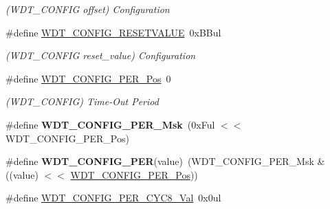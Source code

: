 \begin{DoxyCompactItemize}
\begin{DoxyCompactList}\small\item\em (W\+D\+T\+\_\+\+C\+O\+N\+F\+I\+G offset) Configuration \end{DoxyCompactList}\item 
\hypertarget{group___s_a_m_l21___w_d_t_ga963315e6b2e0dfb513fb236eae8386b0}{}\#define \hyperlink{group___s_a_m_l21___w_d_t_ga963315e6b2e0dfb513fb236eae8386b0}{W\+D\+T\+\_\+\+C\+O\+N\+F\+I\+G\+\_\+\+R\+E\+S\+E\+T\+V\+A\+L\+U\+E}~0x\+B\+Bul\label{group___s_a_m_l21___w_d_t_ga963315e6b2e0dfb513fb236eae8386b0}

\begin{DoxyCompactList}\small\item\em (W\+D\+T\+\_\+\+C\+O\+N\+F\+I\+G reset\+\_\+value) Configuration \end{DoxyCompactList}\item 
\hypertarget{group___s_a_m_l21___w_d_t_ga55662a2fa7e16fd6cc7a5e0800034360}{}\#define \hyperlink{group___s_a_m_l21___w_d_t_ga55662a2fa7e16fd6cc7a5e0800034360}{W\+D\+T\+\_\+\+C\+O\+N\+F\+I\+G\+\_\+\+P\+E\+R\+\_\+\+Pos}~0\label{group___s_a_m_l21___w_d_t_ga55662a2fa7e16fd6cc7a5e0800034360}

\begin{DoxyCompactList}\small\item\em (W\+D\+T\+\_\+\+C\+O\+N\+F\+I\+G) Time-\/\+Out Period \end{DoxyCompactList}\item 
\hypertarget{group___s_a_m_l21___w_d_t_ga7b17345103d170e4fc578db43ad0987e}{}\#define {\bfseries W\+D\+T\+\_\+\+C\+O\+N\+F\+I\+G\+\_\+\+P\+E\+R\+\_\+\+Msk}~(0x\+Ful $<$$<$ W\+D\+T\+\_\+\+C\+O\+N\+F\+I\+G\+\_\+\+P\+E\+R\+\_\+\+Pos)\label{group___s_a_m_l21___w_d_t_ga7b17345103d170e4fc578db43ad0987e}

\item 
\hypertarget{group___s_a_m_l21___w_d_t_gac92933c61d3b2a10b9b14e2c68dcc5c8}{}\#define {\bfseries W\+D\+T\+\_\+\+C\+O\+N\+F\+I\+G\+\_\+\+P\+E\+R}(value)~(W\+D\+T\+\_\+\+C\+O\+N\+F\+I\+G\+\_\+\+P\+E\+R\+\_\+\+Msk \& ((value) $<$$<$ \hyperlink{group___s_a_m_l21___w_d_t_ga55662a2fa7e16fd6cc7a5e0800034360}{W\+D\+T\+\_\+\+C\+O\+N\+F\+I\+G\+\_\+\+P\+E\+R\+\_\+\+Pos}))\label{group___s_a_m_l21___w_d_t_gac92933c61d3b2a10b9b14e2c68dcc5c8}

\item 
\hypertarget{group___s_a_m_l21___w_d_t_gabcc004b82a9df108f7f9916d057943f4}{}\#define \hyperlink{group___s_a_m_l21___w_d_t_gabcc004b82a9df108f7f9916d057943f4}{W\+D\+T\+\_\+\+C\+O\+N\+F\+I\+G\+\_\+\+P\+E\+R\+\_\+\+C\+Y\+C8\+\_\+\+Val}~0x0ul\label{group___s_a_m_l21___w_d_t_gabcc004b82a9df108f7f9916d057943f4}


\end{DoxyCompactItemize}
